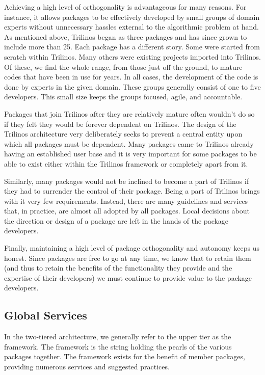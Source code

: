\documentclass[12pt,relax]{article}
\begin{document}
Achieving a high level of orthogonality is advantageous for many reasons.  For 
instance, it allows packages to be effectively developed by small groups of 
domain experts without unnecessary hassles external to the algorithmic problem 
at hand.  As mentioned above, Trilinos began as three packages and has since
grown to include more than 25.  Each package has a different story.  
Some were started from scratch within Trilinos.  Many others were existing
projects imported into Trilinos.  Of these, we find the whole range, from
those just off the ground, to mature codes that have been in use for years.
In all cases, the development of the code is done by experts in the given
domain.  These groups generally consist of one to five developers.  This
small size keeps the groups focused, agile, and accountable.
  
Packages that join Trilinos after they are relatively mature often wouldn't
do so if they felt they would be forever dependent on Trilinos.  The design
of the Trilinos architecture very deliberately seeks to prevent a central
entity upon which all packages must be dependent.  Many packages came to 
Trilinos already having an established user base and it is very important
for some packages to be able to exist either within the Trilinos framework
or completely apart from it.

Similarly, many packages would not be inclined to become a part of Trilinos
if they had to surrender the control of their package.  Being a part of
Trilinos brings with it very few requirements.  Instead, there are many
guidelines and services that, in practice, are almost all adopted by all
packages.  Local decisions about the direction or design of a package are
left in the hands of the package developers.

Finally, maintaining a high level of package orthogonality and autonomy
keeps us honest. Since packages are free to go at any time, we know that
to retain them (and thus to retain the benefits of the functionality they
provide and the expertise of their developers) we must continue to provide
value to the package developers.

\subsection{Global Services}
\label{subsect:GlobalServices}

In the two-tiered architecture, we generally refer to the upper tier as the
framework.  The framework is the string holding the pearls of the various
packages together.  The framework exists for the benefit of member
packages, providing numerous services and suggested practices.
\end{document}
